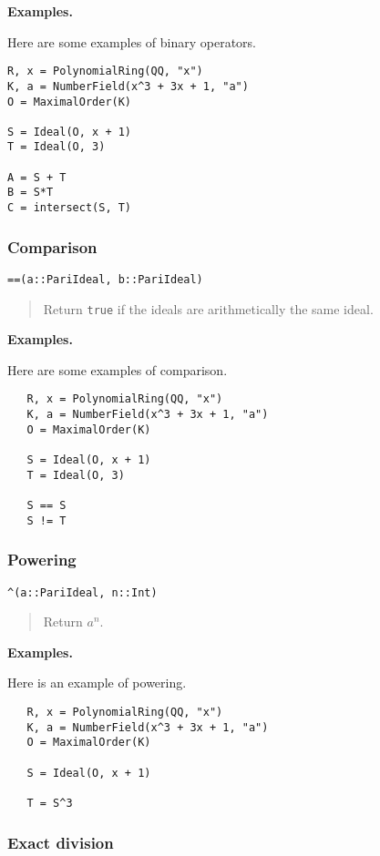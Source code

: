 \documentclass[a4paper,10pt]{article}
\newcommand{\code}{\lstinline}
\newcommand{\desc}[1]{\vspace{-3mm}\begin{quote}#1\end{quote}}
\begin{document}
{{\textbf{Examples.}

Here are some examples of binary operators.

\begin{lstlisting}
R, x = PolynomialRing(QQ, "x")
K, a = NumberField(x^3 + 3x + 1, "a")
O = MaximalOrder(K)

S = Ideal(O, x + 1)
T = Ideal(O, 3)

A = S + T
B = S*T
C = intersect(S, T)
\end{lstlisting}

\subsubsection{Comparison}

\begin{lstlisting}
==(a::PariIdeal, b::PariIdeal)
\end{lstlisting}

\desc{Return \code{true} if the ideals are arithmetically the same ideal.}

\textbf{Examples.}

Here are some examples of comparison.

\begin{lstlisting}
   R, x = PolynomialRing(QQ, "x")
   K, a = NumberField(x^3 + 3x + 1, "a")
   O = MaximalOrder(K)

   S = Ideal(O, x + 1)
   T = Ideal(O, 3)

   S == S
   S != T
\end{lstlisting}

\subsubsection{Powering}

\begin{lstlisting}
^(a::PariIdeal, n::Int)
\end{lstlisting}

\desc{Return $a^n$.}

\textbf{Examples.}

Here is an example of powering.

\begin{lstlisting}
   R, x = PolynomialRing(QQ, "x")
   K, a = NumberField(x^3 + 3x + 1, "a")
   O = MaximalOrder(K)

   S = Ideal(O, x + 1)
   
   T = S^3
\end{lstlisting}

\subsubsection{Exact division}

}}
\end{document}
